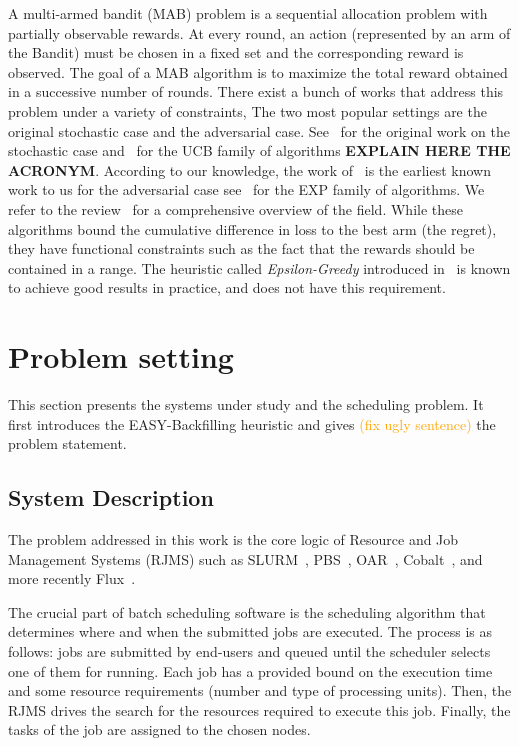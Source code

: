\documentclass[sigconf]{acmart}
\begin{document}
A multi-armed bandit (MAB) problem is a sequential allocation problem with
partially observable rewards. At every round, an action (represented by
an arm of the Bandit) must be chosen
in a fixed set and the corresponding reward is observed. The goal of a MAB
algorithm is to maximize the total reward obtained in a successive
number of rounds.
There exist a bunch of works that address this problem under a variety of
constraints, The two most popular settings are the original stochastic  case
and the adversarial case. See~\cite{thompson} for the original work on the
stochastic case and~\cite{Auer2002} for the UCB family of algorithms
\textbf{EXPLAIN HERE THE ACRONYM}.
According to our knowledge, the work
of~\cite{Banos} is the earliest known work to us for the adversarial case
see~\cite{nonstoch} for the EXP family of algorithms. We refer to the
review~\cite{bubnow} for a comprehensive overview of the field. While these
algorithms bound the cumulative difference in loss to the best arm (the
regret), they have functional constraints such as the fact that the rewards
should be contained in a range. The heuristic called
\textit{Epsilon-Greedy} introduced in~\cite{Auer2002} is known to
achieve good results in practice, and does not have
this requirement.


\section{Problem setting}
\label{sec:problem_setting}

This section presents the systems under study and the scheduling problem.  It
first introduces the EASY-Backfilling heuristic and gives
\textcolor{orange}{(fix ugly sentence)} the problem statement.

\subsection{System Description}
\label{sub:sysdesc}

The problem addressed in this work is the core logic of Resource and Job
Management Systems (RJMS) such as SLURM~\cite{SLURMdocSCHED}, PBS~\cite{PBSdoc},
OAR~\cite{capit2005batch}, Cobalt~\cite{Cobalt}, and more recently Flux~\cite{flux2014}.

The crucial part of batch scheduling software is the scheduling algorithm that determines
where and when the submitted jobs are executed. The process is as follows: jobs
are submitted by end-users and queued until the scheduler selects one of them
for running. Each job has a provided bound on the execution time and some
resource requirements (number and type of processing units). Then, the RJMS
drives the search for the resources required to execute this job. Finally, the
tasks of the job are assigned to the chosen nodes.
\end{document}
